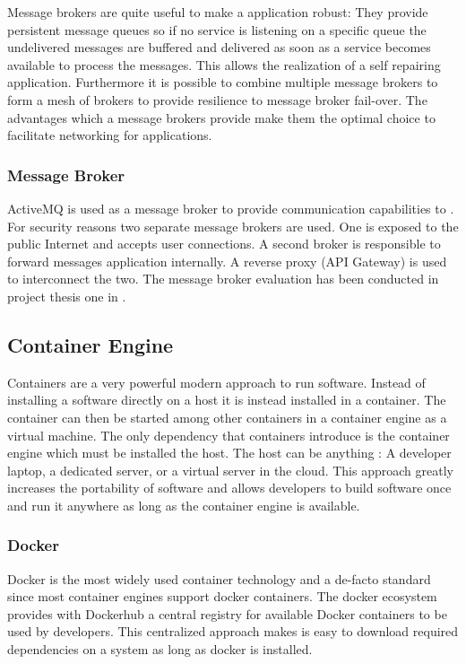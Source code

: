 Message brokers are quite useful to make a \ms{} application robust:
They provide persistent message queues so if no service is listening on a
specific queue the undelivered messages are buffered and delivered as soon as a
service becomes available to process the messages. This allows the realization of a self
repairing application. Furthermore it is possible to combine multiple message
brokers to form a mesh of brokers to provide resilience to message broker
fail-over. The advantages which a message brokers provide make them the optimal
choice to facilitate networking for \ms{} \og{} applications.

\subsubsection{Message Broker}

ActiveMQ is used as a message broker to provide communication capabilities to
\mss{}. For security reasons two separate message brokers are used. One is
exposed to the public Internet and accepts user connections. A second broker is
responsible to forward messages application internally. A reverse proxy (API
Gateway) is used to interconnect the two. The message broker evaluation has been
conducted in project thesis one in .

\subsection{Container Engine}

Containers are a very powerful modern approach to run software. Instead of
installing a software directly on a host it is instead installed in a container.
The container can then be started among other containers in a container engine
as a virtual machine. The only dependency that containers introduce is the
container engine which must be installed the host. The host can be anything : A
developer laptop, a dedicated server, or a virtual server in the cloud.
This approach greatly increases the portability of software and allows
developers to build software once and run it anywhere as long as the container
engine is available.

\subsubsection{Docker}

Docker is the most widely used container technology and a de-facto standard
since most container engines support docker containers. The docker ecosystem
provides with Dockerhub a central registry for available Docker containers to
be used by developers. This centralized approach makes is easy to
download required dependencies on a system as long as docker is installed.


